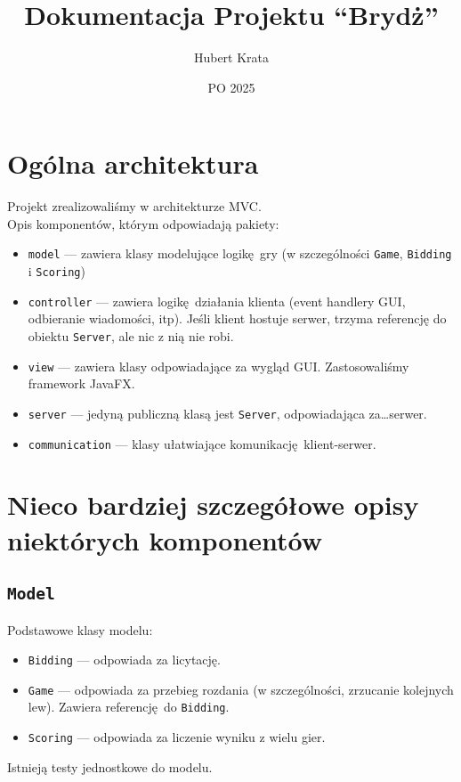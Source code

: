 \documentclass{article}
\title{Dokumentacja Projektu \enquote{Brydż}}
\author{Hubert Krata}
\date{PO 2025}
\newcommand{\ch}[1]{\texttt{#1}}
\begin{document}
\maketitle

\section{Ogólna architektura}

Projekt zrealizowaliśmy w architekturze MVC.\\

Opis komponentów, którym odpowiadają pakiety:
\begin{itemize}
	\item \ch{model} --- zawiera klasy modelujące logikę gry (w szczególności \ch{Game}, \ch{Bidding} i \ch{Scoring})
	\item \ch{controller} --- zawiera logikę działania klienta (event handlery GUI, odbieranie wiadomości, itp). Jeśli klient hostuje serwer, trzyma referencję do obiektu \ch{Server}, ale nic z nią nie robi.
	\item \ch{view} --- zawiera klasy odpowiadające za wygląd GUI. Zastosowaliśmy framework JavaFX.
	\item \ch{server} --- jedyną publiczną klasą jest \ch{Server}, odpowiadająca za\ldots serwer.
	\item \ch{communication} --- klasy ułatwiające komunikację klient-serwer.
\end{itemize}

\section{Nieco bardziej szczegółowe opisy niektórych komponentów}

\subsection{\ch{Model}}

Podstawowe klasy modelu:
\begin{itemize}
	\item \ch{Bidding} --- odpowiada za licytację.
	\item \ch{Game} --- odpowiada za przebieg rozdania (w szczególności, zrzucanie kolejnych lew). Zawiera referencję do \ch{Bidding}.
	\item \ch{Scoring} --- odpowiada za liczenie wyniku z wielu gier.
\end{itemize}

Istnieją testy jednostkowe do modelu.
\end{document}
